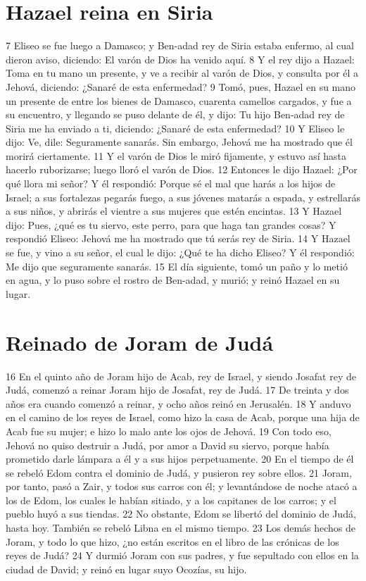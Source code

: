 \section*{Hazael reina en Siria}

7 Eliseo se fue luego a Damasco; y Ben-adad rey de Siria estaba enfermo, al cual dieron aviso, diciendo: El varón de Dios ha venido aquí.
8 Y el rey dijo a Hazael: Toma en tu mano un presente, y ve a recibir al varón de Dios, y consulta por él a Jehová, diciendo: ¿Sanaré de esta enfermedad?
9 Tomó, pues, Hazael en su mano un presente de entre los bienes de Damasco, cuarenta camellos cargados, y fue a su encuentro, y llegando se puso delante de él, y dijo: Tu hijo Ben-adad rey de Siria me ha enviado a ti, diciendo: ¿Sanaré de esta enfermedad?
10 Y Eliseo le dijo: Ve, dile: Seguramente sanarás. Sin embargo, Jehová me ha mostrado que él morirá ciertamente.
11 Y el varón de Dios le miró fijamente, y estuvo así hasta hacerlo ruborizarse; luego lloró el varón de Dios.
12 Entonces le dijo Hazael: ¿Por qué llora mi señor? Y él respondió: Porque sé el mal que harás a los hijos de Israel; a sus fortalezas pegarás fuego, a sus jóvenes matarás a espada, y estrellarás a sus niños, y abrirás el vientre a sus mujeres que estén encintas.
13 Y Hazael dijo: Pues, ¿qué es tu siervo, este perro, para que haga tan grandes cosas? Y respondió Eliseo: Jehová me ha mostrado que tú serás rey de Siria. 
14 Y Hazael se fue, y vino a su señor, el cual le dijo: ¿Qué te ha dicho Eliseo? Y él respondió: Me dijo que seguramente sanarás.
15 El día siguiente, tomó un paño y lo metió en agua, y lo puso sobre el rostro de Ben-adad, y murió; y reinó Hazael en su lugar.

\section*{Reinado de Joram de Judá}

16 En el quinto año de Joram hijo de Acab, rey de Israel, y siendo Josafat rey de Judá, comenzó a reinar Joram hijo de Josafat, rey de Judá.
17 De treinta y dos años era cuando comenzó a reinar, y ocho años reinó en Jerusalén.
18 Y anduvo en el camino de los reyes de Israel, como hizo la casa de Acab, porque una hija de Acab fue su mujer; e hizo lo malo ante los ojos de Jehová.
19 Con todo eso, Jehová no quiso destruir a Judá, por amor a David su siervo, porque había prometido darle lámpara a él y a sus hijos perpetuamente. 
20 En el tiempo de él se rebeló Edom contra el dominio de Judá, y pusieron rey sobre ellos.
21 Joram, por tanto, pasó a Zair, y todos sus carros con él; y levantándose de noche atacó a los de Edom, los cuales le habían sitiado, y a los capitanes de los carros; y el pueblo huyó a sus tiendas.
22 No obstante, Edom se libertó del dominio de Judá, hasta hoy. También se rebeló Libna en el mismo tiempo.
23 Los demás hechos de Joram, y todo lo que hizo, ¿no están escritos en el libro de las crónicas de los reyes de Judá?
24 Y durmió Joram con sus padres, y fue sepultado con ellos en la ciudad de David; y reinó en lugar suyo Ocozías, su hijo.

